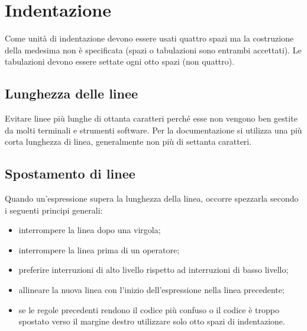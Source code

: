 \section{Indentazione}
Come unità di indentazione devono essere usati quattro spazi ma la costruzione della medesima non è specificata (spazi o tabulazioni sono entrambi accettati). Le tabulazioni devono essere settate ogni otto spazi (non quattro).

\subsection{Lunghezza delle linee}
Evitare linee più lunghe di ottanta caratteri perché esse non vengono ben gestite da molti terminali e strumenti software. Per la documentazione si utilizza una più corta lunghezza di linea, generalmente non più di settanta caratteri.

\subsection{Spostamento di linee}
Quando un'espressione supera la lunghezza della linea, occorre spezzarla secondo i seguenti principi generali:
\begin{itemize}
  \item interrompere la linea dopo una virgola;
  \item interrompere la linea prima di un operatore;
  \item preferire interruzioni di alto livello rispetto ad interruzioni di basso livello;
  \item allineare la nuova linea con l'inizio dell'espressione nella linea precedente;
  \item se le regole precedenti rendono il codice più confuso o il codice è troppo spostato verso il margine destro utilizzare solo otto spazi di indentazione.
\end{itemize}
%  

